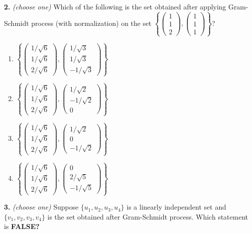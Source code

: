 \documentclass[10pt,a4paper]{article}
\begin{document}
\smallskip
\textbf{2.} \textit{(choose one)} Which of the following is the set obtained after applying Gram-Schmidt process (with normalization) on the set \(\left\{\begin{pmatrix}1\\1\\2\end{pmatrix},\begin{pmatrix}1\\1\\1\end{pmatrix} \right\}\)?

\begin{enumerate}[label=(\Alph*)]
\item \(\left\{\begin{pmatrix}1/\sqrt{6}\\1/\sqrt{6}\\2/\sqrt{6}\end{pmatrix},\begin{pmatrix}1/\sqrt{3}\\1/\sqrt{3}\\-1/\sqrt{3}\end{pmatrix} \right\}\)
\item \(\left\{\begin{pmatrix}1/\sqrt{6}\\1/\sqrt{6}\\2/\sqrt{6}\end{pmatrix},\begin{pmatrix}1/\sqrt{2}\\-1/\sqrt{2}\\0\end{pmatrix} \right\}\)
\item \(\left\{\begin{pmatrix}1/\sqrt{6}\\1/\sqrt{6}\\2/\sqrt{6}\end{pmatrix},\begin{pmatrix}1/\sqrt{2}\\0\\-1/\sqrt{2}\end{pmatrix} \right\}\)
\item \(\left\{\begin{pmatrix}1/\sqrt{6}\\1/\sqrt{6}\\2/\sqrt{6}\end{pmatrix},\begin{pmatrix}0\\2/\sqrt{5}\\-1/\sqrt{5}\end{pmatrix} \right\}\)
\end{enumerate}
\smallskip
\textbf{3.} \textit{(choose one)} Suppose \(\{u_1,u_2,u_3,u_4\}\) is a linearly independent set and \(\{v_1,v_2,v_3,v_4\}\) is the set obtained after Gram-Schmidt process. Which statement is \textbf{FALSE?}
\end{document}
